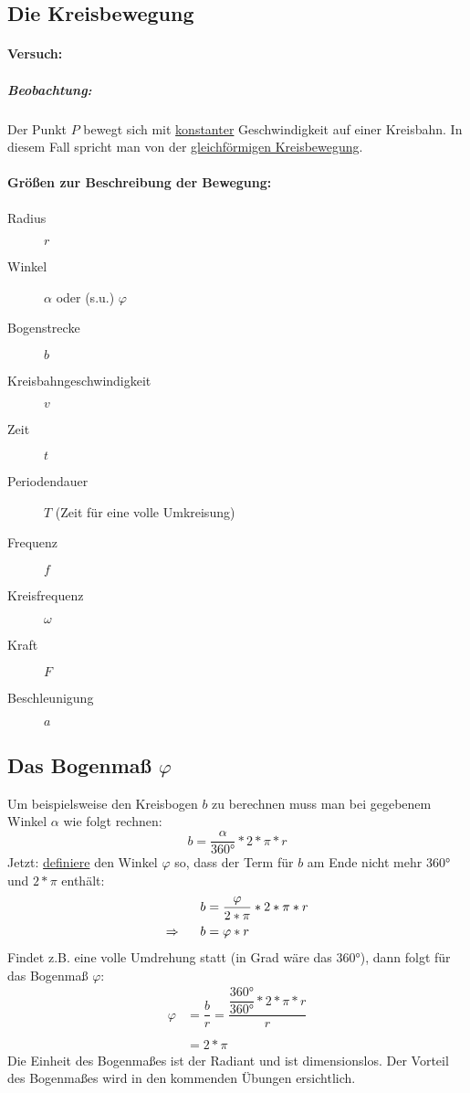 	\subsection{Die Kreisbewegung}
	\paragraph{Versuch:}
	\subparagraph{Beobachtung:}
	Der Punkt $ P $ bewegt sich mit \underline{konstanter} Geschwindigkeit auf einer Kreisbahn. In diesem Fall spricht man von der \underline{gleichförmigen Kreisbewegung}.\\
	\paragraph{Größen zur Beschreibung der Bewegung:}
	\begin{description}
		\item[Radius] $ r $
		\item[Winkel] $ \alpha $ oder (s.u.) $ \varphi $
		\item[Bogenstrecke] $ b $
		\item[Kreisbahngeschwindigkeit] $ v $
		\item[Zeit] $ t $
		\item[Periodendauer] $ T $ (Zeit für eine volle Umkreisung)
		\item[Frequenz] $ f $
		\item[Kreisfrequenz] $ \omega $
		\item[Kraft] $ F $
		\item[Beschleunigung] $ a $
	\end{description}
	
	\subsection{Das Bogenmaß $\varphi$}
	Um beispielsweise den Kreisbogen $ b $ zu berechnen muss man bei gegebenem Winkel $ \alpha $ wie folgt rechnen:
	\begin{equation}
		b = \dfrac{\alpha}{360°}*2*\pi*r
	\end{equation}
	Jetzt: \underline{definiere} den Winkel $ \varphi $ so, dass der Term für $ b $ am Ende nicht mehr $ 360° $ und $ 2*\pi $ enthält:
	\begin{align}
		b &= \dfrac{\varphi}{2*\pi}*2*\pi*r\\
		\Rightarrow\hspace{0.5cm} b &= \varphi*r
	\end{align}
	Findet z.B. eine volle Umdrehung statt (in Grad wäre das $ 360° $), dann folgt für das Bogenmaß $ \varphi $:
	\begin{align}
		\varphi &= \dfrac{b}{r} = \dfrac{\dfrac{360°}{360°}*2*\pi*r}{r}\\
		\nonumber\\
		&= 2*\pi
	\end{align}
	Die Einheit des Bogenmaßes ist der Radiant und ist dimensionslos. Der Vorteil des Bogenmaßes wird in den kommenden Übungen ersichtlich.
	
